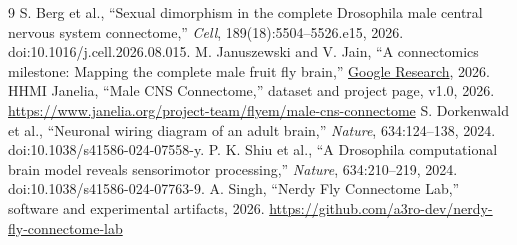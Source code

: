\documentclass[9pt,twocolumn]{extarticle}
\begin{document}
\begin{thebibliography}{9}\small
{} S. Berg et al., ``Sexual dimorphism in the complete Drosophila male central nervous system connectome,'' \emph{Cell}, 189(18):5504--5526.e15, 2026. doi:10.1016/j.cell.2026.08.015.
 M. Januszewski and V. Jain, ``A connectomics milestone: Mapping the complete male fruit fly brain,'' \href{https://research.google/blog/a-connectomics-milestone-mapping-the-complete-male-fruit-fly-brain/}{Google Research}, 2026.
 HHMI Janelia, ``Male CNS Connectome,'' dataset and project page, v1.0, 2026. \url{https://www.janelia.org/project-team/flyem/male-cns-connectome}
 S. Dorkenwald et al., ``Neuronal wiring diagram of an adult brain,'' \emph{Nature}, 634:124--138, 2024. doi:10.1038/s41586-024-07558-y.
 P. K. Shiu et al., ``A Drosophila computational brain model reveals sensorimotor processing,'' \emph{Nature}, 634:210--219, 2024. doi:10.1038/s41586-024-07763-9.
 A. Singh, ``Nerdy Fly Connectome Lab,'' software and experimental artifacts, 2026. \url{https://github.com/a3ro-dev/nerdy-fly-connectome-lab}
\end{thebibliography}
\end{document}
